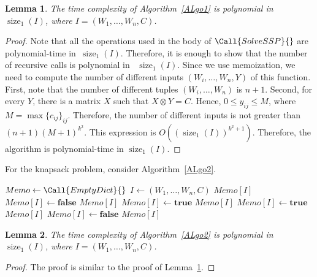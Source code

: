 \documentclass[reqno,12pt]{amsart}
\newtheorem{lemma}{Lemma}
\theoremstyle{definition}
\DeclareMathOperator{\size}{size}
\DeclareMathOperator{\V}{\mathrm{V}}
\begin{document}
\begin{lemma}\label{LemmaAlgo1}
The time complexity of Algorithm~\ref{ALgo1} is polynomial in $\size_1(I)$, where $I = (W_1, \ldots, W_n, C)$.
\end{lemma}
\begin{proof}
Note that all the operations used in the body of $\Call{SolveSSP}{}$ are polynomial-time in~$\size_1(I)$.
Therefore, it is enough to show that the number of recursive calls is polynomial in ~$\size_1(I)$.
Since we use memoization, we need to compute the number of different inputs $(W_i, \ldots, W_n, Y)$ of this function.
First, note that the number of different tuples $(W_i, \ldots, W_n)$ is $n + 1$. Second, 
for every $Y$, there is a matrix $X$ such that $X \otimes Y = C$. Hence, $0 \leq y_{ij} \leq M$, where $M = \max\{c_{ij}\}_{ij}$. Therefore,
the number of different inputs is not greater than
$(n + 1) (M + 1)^{k^2}$. This expression is $O((\size_1(I))^{k^2 + 1})$. 
Therefore, the algorithm is polynomial-time in $\size_1(I)$.
\end{proof}

For the knapsack problem, consider Algorithm~\ref{ALgo2}.

\begin{algorithm}
    \caption{}\label{ALgo2}
    \begin{algorithmic}[0]
        \State $Memo \gets \Call{EmptyDict}{ }$
            \State $I \gets (W_1, \ldots, W_n, C)$
                \Return $Memo[I]$
            \EndIf
                \State $Memo[I] \gets \textbf{false}$
                \State \Return $Memo[I]$
            \EndIf
                \State $Memo[I] \gets \textbf{true}$
                \State \Return $Memo[I]$   
            \EndIf
            \ForAll {$X \in \V_\mathcal{S}(W_1 \otimes X = C)$}
                    \State $Memo[I] \gets \textbf{true}$
                    \State \Return $Memo[I]$   
                \EndIf
             \EndFor
             \State $Memo[I] \gets \textbf{false}$
             \State \Return $Memo[I]$
        \EndFunction
    \end{algorithmic}
\end{algorithm}

\begin{lemma}\label{LemmaAlgo2}
The time complexity of Algorithm~\ref{ALgo2} is polynomial in $\size_1(I)$, where $I = (W_1, \ldots, W_n, C)$.
\end{lemma}
\begin{proof}
The proof is similar to the proof of Lemma~\ref{LemmaAlgo1}.
\end{proof}
\end{document}
